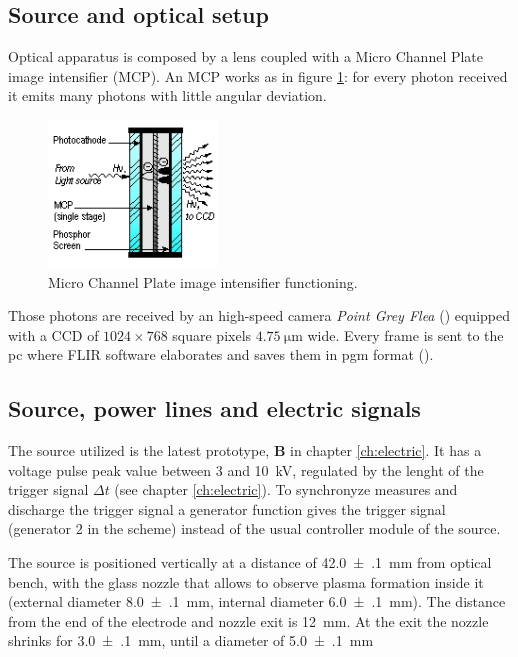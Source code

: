 \subsection{Source and optical setup}
Optical apparatus is composed by a lens %
 coupled with a Micro Channel Plate image intensifier (MCP). An MCP works as in figure \ref{fig:MCP}: for every photon received it emits many photons with little angular deviation.
\begin{figure}
 \centering
 \includegraphics[width=0.4\textwidth]{Images/Shape/MCPsingle-stage.jpg}
 \caption{Micro Channel Plate image intensifier functioning.}
 \label{fig:MCP}
\end{figure}

Those photons are received by an high-speed camera \emph{Point Grey Flea} (\cite{flea}) equipped with a CCD of $\num{1024} \times \num{768}$ square pixels $\SI{4.75}{\micro\meter}$ wide. Every frame is sent to the pc where FLIR software elaborates and saves them in pgm format (\cite{pgm}).

\subsection{Source, power lines and electric signals}
The source utilized is the latest prototype, \textbf{B} in chapter \ref{ch:electric}. It has a voltage pulse peak value between $\num{3}$ and \SI{10}{\kilo\volt}, regulated by the lenght of the trigger signal $\Delta t$ (see chapter \ref{ch:electric}). To synchronyze measures and discharge the trigger signal a generator function gives the trigger signal (generator $2$ in the scheme) instead of the usual controller module of the source.

The source is positioned vertically at a distance of \SI{42.0(1)}{\milli\meter} from optical bench, with the glass nozzle that allows to observe plasma formation inside it (external diameter \SI{8.0(1)}{\milli\meter}, internal diameter \SI{6.0(1)}{\milli\meter}). The distance from the end of the electrode and nozzle exit is \SI{12}{\milli\meter}. At the exit the nozzle shrinks for \SI{3.0(1)}{\milli\meter}, until a diameter of \SI{5.0(1)}{\milli\meter}

